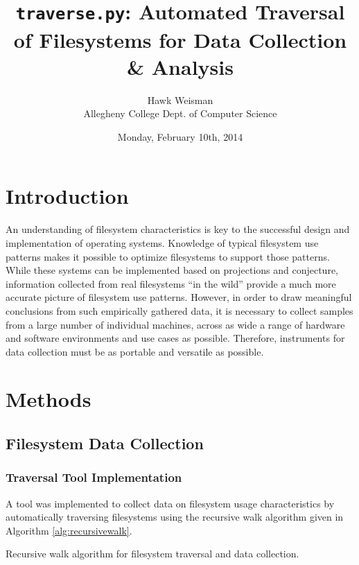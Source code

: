 \documentclass[12pt,a4paper]{article}
\author{Hawk Weisman\\Allegheny College Dept. of Computer Science}
\title{\texttt{traverse.py}: Automated Traversal of Filesystems for Data Collection \& Analysis}
\date{Monday, February 10th, 2014}
\begin{document}
	\maketitle
	\tableofcontents
	\section{Introduction}
		
		An understanding of filesystem characteristics is key to the successful design and implementation of operating systems. Knowledge of typical filesystem use patterns makes it possible to optimize filesystems to support those patterns. While these systems can be implemented based on projections and conjecture, information collected from real filesystems ``in the wild'' provide a much more accurate picture of filesystem use patterns. However, in order to draw meaningful conclusions from such empirically gathered data, it is necessary to collect samples from a large number of individual machines, across as wide a range of hardware and software environments and use cases as possible. Therefore, instruments for data collection must be as portable and versatile as possible.

	\section{Methods}
		\subsection{Filesystem Data Collection}

			\subsubsection{Traversal Tool Implementation}

				A tool was implemented to collect data on filesystem usage characteristics by automatically traversing filesystems using the recursive walk algorithm given in Algorithm \ref{alg:recursivewalk}.
			
				\begin{algorithm}
					\caption{Recursive walk algorithm for filesystem traversal and data collection.}
					\label{alg:recursivewalk}
					\begin{algorithmic}[1]
				   		\State {}
				     	\State {}
				     	\EndIf
				   	\EndFor
					\EndProcedure
					\end{algorithmic}
				\end{algorithm}
\end{document}
